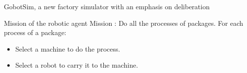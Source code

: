 \begin{frame}{GobotSim, a new factory simulator with an emphasis on deliberation}

            
\end{frame}


            

    

\begin{frame}{Mission of the robotic agent}
Mission : Do all the processes of packages.
For each process of a package:
\begin{itemize}
    \item Select a machine to do the process.
    \item Select a robot to carry it to the machine.
\end{itemize}

\end{frame}
